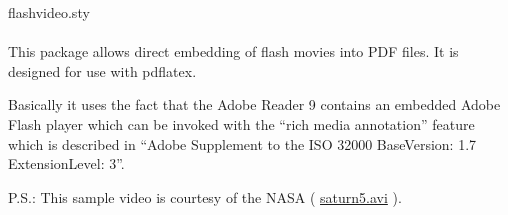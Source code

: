 \documentclass[10pt]{article}
\begin{document}
{\Huge flashvideo.sty}\\\\

This package allows direct embedding of flash movies into PDF files. It is
designed for use with pdflatex.


Basically it uses the fact that the Adobe Reader 9 contains an embedded Adobe Flash 
player which can be invoked with the ``rich media annotation'' feature which is described 
in ``Adobe Supplement to the ISO 32000 BaseVersion: 1.7 ExtensionLevel: 3''.

P.S.: This sample video is courtesy of the NASA ( \href{http://heasarc.gsfc.nasa.gov/Videos/historical/saturn5.avi}{saturn5.avi} ).
\end{document}
